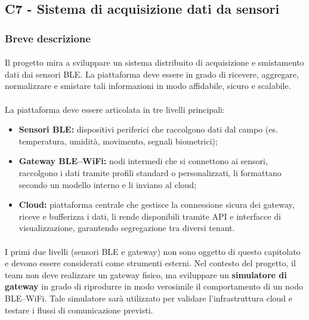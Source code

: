 \documentclass[a4paper,11pt]{article}
\begin{document}
\subsection{C7 - Sistema di acquisizione dati da sensori}
\subsubsection{Breve descrizione}
\paragraph{} 
Il progetto mira a sviluppare un sistema distribuito di acquisizione e smistamento dati dai sensori BLE. 
La piattaforma deve essere in grado di ricevere, aggregare, normalizzare e smistare tali informazioni in modo affidabile, sicuro e scalabile.

\paragraph{} 
La piattaforma deve essere articolata in tre livelli principali:

\begin{itemize}
 \item \textbf{Sensori BLE:} dispositivi periferici che raccolgono dati dal campo (es. temperatura, umidità, movimento, segnali biometrici);
 \item \textbf{Gateway BLE--WiFi:} nodi intermedi che si connettono ai sensori, raccolgono i dati tramite profili standard o personalizzati, 
 li formattano secondo un modello interno e li inviano al cloud;
 \item \textbf{Cloud:} piattaforma centrale che gestisce la connessione sicura dei gateway, riceve e bufferizza i dati, 
 li rende disponibili tramite API e interfacce di visualizzazione, garantendo segregazione tra diversi tenant.
\end{itemize}

\paragraph{} 
I primi due livelli (sensori BLE e gateway) non sono oggetto di questo capitolato e devono essere considerati come strumenti esterni. 
Nel contesto del progetto, il team non deve realizzare un gateway fisico, ma sviluppare un \textbf{simulatore di gateway} 
in grado di riprodurre in modo verosimile il comportamento di un nodo BLE--WiFi. 
Tale simulatore sarà utilizzato per validare l'infrastruttura cloud e testare i flussi di comunicazione previsti.
\end{document}

